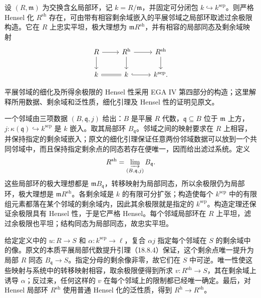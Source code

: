 \begin{proposition}\label{b3:prop:strict-henselization-existence}
	设 \((R,\mathfrak m)\) 为交换含幺局部环，记 \(k=R/\mathfrak m\)，并固定可分闭包 \(k\hookrightarrow k^{\mathrm{sep}}\)。则严格 Hensel 化 \(R^{\mathrm{sh}}\) 存在，可由带有相容剩余域嵌入的平展邻域之局部环取滤过余极限构造。它在 \(R\) 上忠实平坦，极大理想为 \(\mathfrak mR^{\mathrm{sh}}\)，并有相容的局部同态及剩余域映射
	\[
		\begin{tikzcd}
			R \arrow[r] \arrow[d] & R^{\mathrm h} \arrow[r] \arrow[d] & R^{\mathrm{sh}} \arrow[d] \\
			k \arrow[r,equal] & k \arrow[r,hook] & k^{\mathrm{sep}} .
		\end{tikzcd}
	\]
\end{proposition}
\begin{proofsketch}
	平展邻域的细化及所得余极限的 Hensel 性采用 EGA IV 第四部分的构造；这里解释所用数据、剩余域和泛性质，细化引理及 Hensel 性的证明见原文\cite[(18.8.4)--(18.8.8), pp. 145--147]{Grothendieck1967EGAIV4}。

	一个邻域由三项数据 \((B,\mathfrak q,j)\) 给出：\(B\) 是平展 \(R\) 代数，\(\mathfrak q\subseteq B\) 位于 \(\mathfrak m\) 上方，\(j:\kappa(\mathfrak q)\hookrightarrow k^{\mathrm{sep}}\) 是 \(k\) 嵌入。取其局部环 \(B_{\mathfrak q}\)。邻域之间的映射要求在 \(R\) 上相容，并保持指定的剩余域嵌入；原文的细化引理保证任意两份邻域数据可以放到一个共同邻域中，而且保持指定剩余点的同态若存在便唯一，因而给出滤过系统。定义
	\[
		R^{\mathrm{sh}}=\varinjlim_{(B,\mathfrak q,j)}B_{\mathfrak q}.
	\]
	这些局部环的极大理想都是 \(\mathfrak mB_{\mathfrak q}\)，转移映射为局部同态，所以余极限仍为局部环，极大理想是 \(\mathfrak mR^{\mathrm{sh}}\)。各剩余域是 \(k\) 的有限可分扩张；构造使每个 \(k^{\mathrm{sep}}\) 中的有限组元素都落在某个邻域的剩余域内，因此其余极限就是指定的 \(k^{\mathrm{sep}}\)。构造定理还保证余极限具有 Hensel 性，于是它严格 Hensel。每个邻域局部环在 \(R\) 上平坦，滤过余极限也平坦；结构同态为局部同态，故忠实平坦。

	给定定义中的 \(u:R\to S\) 和 \(\alpha:k^{\mathrm{sep}}\to\ell\)，复合 \(\alpha j\) 指定每个邻域在 \(S\) 的剩余域中的像。原文的本质平展局部代数提升引理（18.8.4）保证，这个剩余点唯一提升为局部 \(R\) 同态 \(B_{\mathfrak q}\to S\)。指定分母的剩余像非零，故它们在 \(S\) 中可逆。唯一性使这些映射与系统中的转移映射相容，取余极限便得到所求 \(v:R^{\mathrm{sh}}\to S\)，其在剩余域上诱导 \(\alpha\)；反过来，任何这样的 \(v\) 在每个邻域上的限制都已经唯一确定。最后，对 Hensel 局部环 \(R^{\mathrm{sh}}\) 使用普通 Hensel 化的泛性质，得到 \(R^{\mathrm h}\to R^{\mathrm{sh}}\)。
\end{proofsketch}

